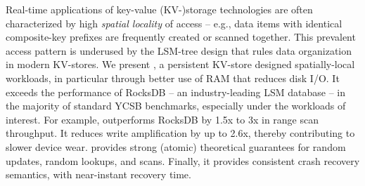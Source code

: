 Real-time applications of key-value (KV-)storage technologies are often characterized by high \emph{spatial locality}
of access -- e.g., data items with identical composite-key prefixes are frequently created or scanned together.  
This prevalent access pattern is underused by the LSM-tree design that rules data organization in modern KV-stores.
We present \sys, a persistent KV-store designed spatially-local workloads, in particular through better use of RAM
that reduces disk I/O.  It exceeds the performance of RocksDB -- an industry-leading LSM database -- in the majority 
of standard YCSB benchmarks, especially under the workloads of interest. For example, \sys\/ outperforms RocksDB 
by 1.5x to 3x in range scan throughput. It reduces write amplification by up to 2.6x, thereby contributing to slower 
device wear. \sys\/ provides strong (atomic) theoretical guarantees for random updates, random lookups, and scans. 
Finally, it provides consistent crash recovery semantics, with near-instant recovery time. 